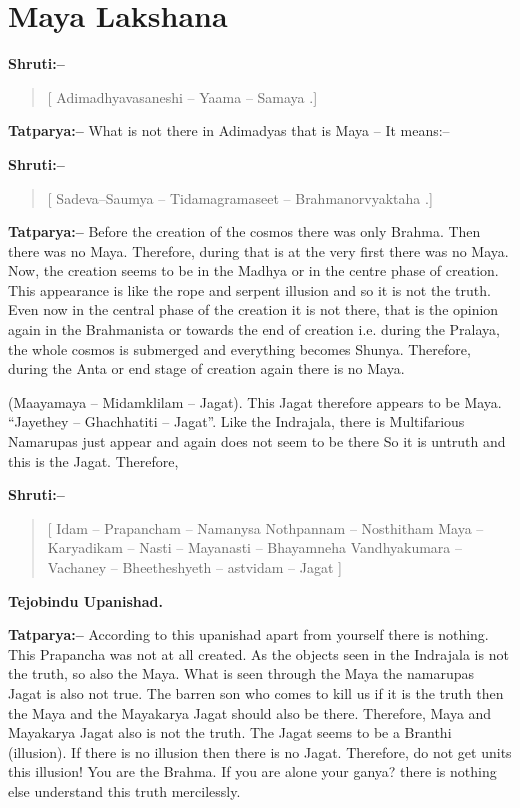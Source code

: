\chapter{Maya Lakshana}

\textbf{Shruti:–}

\begin{verse}
[ Adimadhyavasaneshi – Yaama – Samaya .]
\end{verse}

\textbf{Tatparya:–} What is not there in Adimadyas that is Maya – It means:–

\textbf{Shruti:–}

\begin{verse}
[ Sadeva–Saumya – Tidamagramaseet – Brahmanorvyaktaha .]
\end{verse}

\textbf{Tatparya:–} Before the creation of the cosmos there was only Brahma. Then there was no Maya. Therefore, during that is at the very first there was no Maya. Now, the creation seems to be in the Madhya or in the centre phase of creation. This appearance is like the rope and serpent illusion and so it is not the truth. Even now in the central phase of the creation it is not there, that is the opinion again in the Brahmanista or towards the end of creation i.e. during the Pralaya, the whole cosmos is submerged and everything becomes Shunya. Therefore, during the Anta or end stage of creation again there is no Maya.

(Maayamaya – Midamklilam – Jagat). This Jagat therefore appears to be Maya. “Jayethey – Ghachhatiti – Jagat”. Like the Indrajala, there is Multifarious Namarupas just appear and again does not seem to be there So it is untruth and this is the Jagat. Therefore,

\textbf{Shruti:–}

\begin{verse}
[ Idam – Prapancham – Namanysa Nothpannam – Nosthitham  Maya – Karyadikam – Nasti – Mayanasti – Bhayamneha Vandhyakumara – Vachaney – Bheetheshyeth – astvidam – Jagat ]
\end{verse}

\begin{flushright}
\textbf{Tejobindu Upanishad.}
\end{flushright}

\textbf{Tatparya:–} According to this upanishad apart from yourself there is nothing. This Prapancha was not at all created. As the objects seen in the Indrajala is not the truth, so also the Maya. What is seen through the Maya the namarupas Jagat is also not true. The barren son who comes to kill us if it is the truth then the Maya and the Mayakarya Jagat should also be there. Therefore, Maya and Mayakarya Jagat also is not the truth. The Jagat seems to be a Branthi (illusion). If there is no illusion then there is no Jagat. Therefore, do not get units this illusion! You are the Brahma. If you are alone your ganya? there is nothing else understand this truth mercilessly.

